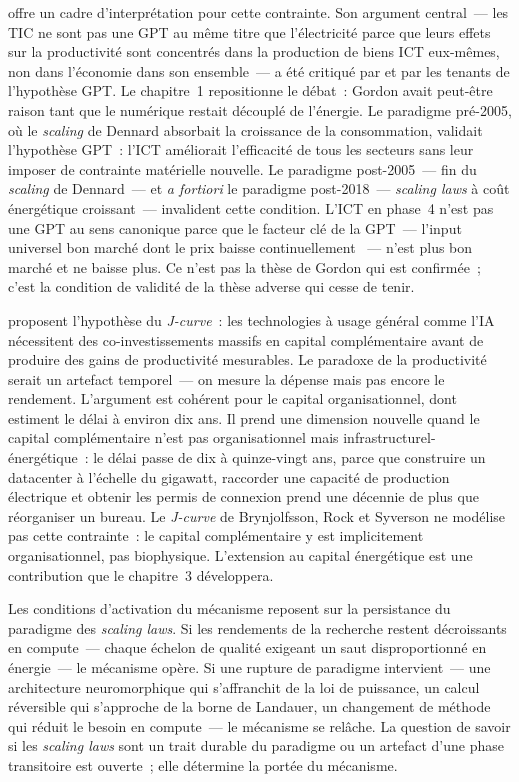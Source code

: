 \textcite{gordon_does_2000} offre un cadre d'interprétation pour cette contrainte. Son argument central~--- les TIC ne sont pas une GPT au même titre que l'électricité parce que leurs effets sur la productivité sont concentrés dans la production de biens ICT eux-mêmes, non dans l'économie dans son ensemble~--- a été critiqué par \textcite{bresnahan_general_1995} et par les tenants de l'hypothèse GPT. Le chapitre~1 repositionne le débat~: Gordon avait peut-être raison tant que le numérique restait découplé de l'énergie. Le paradigme pré-2005, où le \emph{scaling} de Dennard absorbait la croissance de la consommation, validait l'hypothèse GPT~: l'ICT améliorait l'efficacité de tous les secteurs sans leur imposer de contrainte matérielle nouvelle. Le paradigme post-2005~--- fin du \emph{scaling} de Dennard~--- et \emph{a fortiori} le paradigme post-2018~--- \emph{scaling laws} à coût énergétique croissant~--- invalident cette condition. L'ICT en phase~4 n'est pas une GPT au sens canonique parce que le facteur clé de la GPT~--- l'input universel bon marché dont le prix baisse continuellement \parencite{bresnahan_general_1995}~--- n'est plus bon marché et ne baisse plus. Ce n'est pas la thèse de Gordon qui est confirmée~; c'est la condition de validité de la thèse adverse qui cesse de tenir.

\textcite{brynjolfsson_artificial_2019} proposent l'hypothèse du \emph{J-curve}~: les technologies à usage général comme l'IA nécessitent des co-investissements massifs en capital complémentaire avant de produire des gains de productivité mesurables. Le paradoxe de la productivité serait un artefact temporel~--- on mesure la dépense mais pas encore le rendement. L'argument est cohérent pour le capital organisationnel, dont \textcite{bresnahan_information_2002} estiment le délai à environ dix ans. Il prend une dimension nouvelle quand le capital complémentaire n'est pas organisationnel mais infrastructurel-énergétique~: le délai passe de dix à quinze-vingt ans, parce que construire un datacenter à l'échelle du gigawatt, raccorder une capacité de production électrique et obtenir les permis de connexion prend une décennie de plus que réorganiser un bureau. Le \emph{J-curve} de Brynjolfsson, Rock et Syverson ne modélise pas cette contrainte~: le capital complémentaire y est implicitement organisationnel, pas biophysique. L'extension au capital énergétique est une contribution que le chapitre~3 développera.

Les conditions d'activation du mécanisme reposent sur la persistance du paradigme des \emph{scaling laws}. Si les rendements de la recherche restent décroissants en compute~--- chaque échelon de qualité exigeant un saut disproportionné en énergie~--- le mécanisme opère. Si une rupture de paradigme intervient~--- une architecture neuromorphique qui s'affranchit de la loi de puissance, un calcul réversible qui s'approche de la borne de Landauer, un changement de méthode qui réduit le besoin en compute~--- le mécanisme se relâche. La question de savoir si les \emph{scaling laws} sont un trait durable du paradigme ou un artefact d'une phase transitoire est ouverte~; elle détermine la portée du mécanisme.

